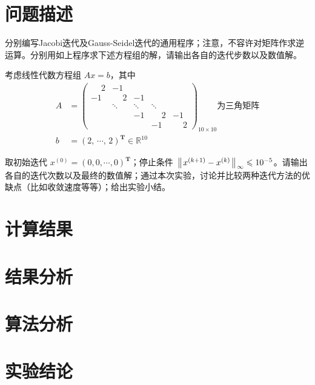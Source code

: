 \documentclass[11pt]{article}
\begin{document}
\maketitle %

\thispagestyle{empty} %

\newpage

\section{问题描述}
分别编写Jacobi迭代及Gauss-Seidel迭代的通用程序；注意，不容许对矩阵作求逆运算。分别用如上程序求下述方程组的解，请输出各自的迭代步数以及数值解。

考虑线性代数方程组 $Ax = b$，其中
\begin{align*}
    A & =
    \begin{pmatrix}
        \phantom{-}2 & -1           &        &              &              \\
        -1           & \phantom{-}2 & -1     &              &              \\
                     & \ddots       & \ddots & \ddots       &              \\
                     &              & -1     & \phantom{-}2 & -1           \\
                     &              &        & -1           & \phantom{-}2
    \end{pmatrix}_{10 \times 10}
    \text{为三角矩阵}                                       \\
    b & = (2,\, \cdots,\, 2)^\mathbf{T} \in \mathbb{R}^{10}
\end{align*}

取初始迭代 $x^{(0)} = (0, 0, \cdots, 0)^\mathbf{T}$；停止条件 $\left\Arrowvert x^{(k + 1)} - x^{(k)} \right\Arrowvert_{\infty} \leqslant 10^{-5}$。请输出各自的迭代次数以及最终的数值解；通过本次实验，讨论并比较两种迭代方法的优缺点（比如收敛速度等等）；给出实验小结。


\section{计算结果}

\section{结果分析}

\section{算法分析}

\section{实验结论}
\end{document}
